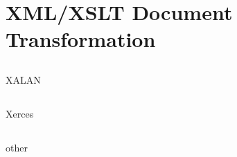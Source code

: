 \section{XML/XSLT Document Transformation}

\subsection{}
XALAN
\subsection{}
Xerces
\subsection{}
other